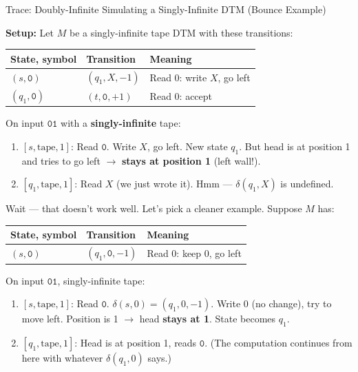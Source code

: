 \begin{examplebox}{{Trace: Doubly-Infinite Simulating a Singly-Infinite DTM (Bounce Example)}}

\textbf{Setup:} Let $M$ be a singly-infinite tape DTM with these transitions:
\begin{center}
\begin{tabular}{lll}
\toprule
\textbf{State, symbol} & \textbf{Transition} & \textbf{Meaning} \\
\midrule
$(s, \mathtt{0})$ & $(q_1, X, -1)$ & Read 0: write $X$, go left \\
$(q_1, \mathtt{0})$ & $(t, \mathtt{0}, +1)$ & Read 0: accept \\
\bottomrule
\end{tabular}
\end{center}

On input $\mathtt{01}$ with a \textbf{singly-infinite} tape:
\begin{enumerate}[nosep]
\item $[s, \text{tape}, 1]$: Read $\mathtt{0}$. Write $X$, go left. New state $q_1$.
  But head is at position 1 and tries to go left $\to$ \textbf{stays at position 1} (left wall!).
\item $[q_1, \text{tape}, 1]$: Read $X$ (we just wrote it). Hmm --- $\delta(q_1, X)$ is undefined.
\end{enumerate}

Wait --- that doesn't work well. Let's pick a cleaner example. Suppose $M$ has:
\begin{center}
\begin{tabular}{lll}
\toprule
\textbf{State, symbol} & \textbf{Transition} & \textbf{Meaning} \\
\midrule
$(s, \mathtt{0})$ & $(q_1, \mathtt{0}, -1)$ & Read 0: keep 0, go left \\
\bottomrule
\end{tabular}
\end{center}

On input $\mathtt{01}$, singly-infinite tape:
\begin{enumerate}[nosep]
\item $[s, \text{tape}, 1]$: Read $\mathtt{0}$. $\delta(s, 0) = (q_1, 0, -1)$.
  Write 0 (no change), try to move left. Position is 1 $\to$ head \textbf{stays at 1}. State becomes $q_1$.
\item $[q_1, \text{tape}, 1]$: Head is at position 1, reads $\mathtt{0}$.
  (The computation continues from here with whatever $\delta(q_1, 0)$ says.)
\end{enumerate}


\end{examplebox}
